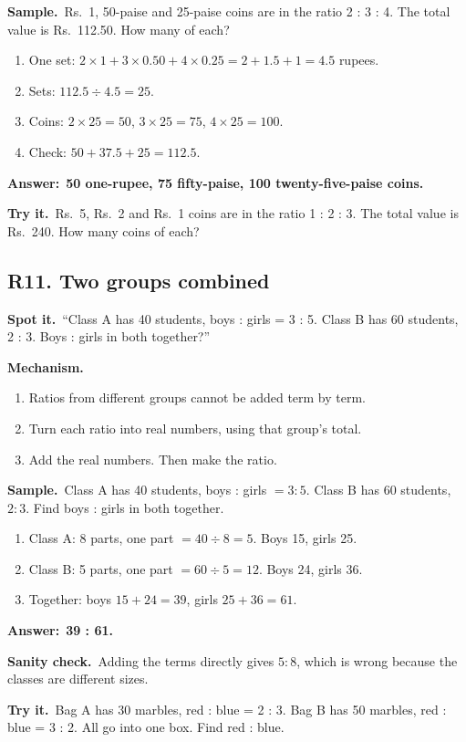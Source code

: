 \documentclass[11pt,a4paper]{article}
\let\oldsubsection\subsection
\renewcommand{\subsection}{\needspace{9\baselineskip}\oldsubsection}
\newcommand{\spot}{\textbf{\color{ember}Spot it.}\ }
\newcommand{\mech}{\textbf{\color{ember}Mechanism.}\ }
\newif\ifkeepsamp
\newcommand{\ans}[1]{\par\nopagebreak\noindent\textbf{\color{ember}Answer:}\ \textbf{#1}\par}
\newcommand{\samp}{\ifkeepsamp\needspace{4\baselineskip}\fi\textbf{\color{ember}Sample.}\ }
\newcommand{\sane}{\textbf{\color{slate}Sanity check.}\ }
\newcommand{\tryit}[1]{\textbf{\color{ember}Try it.}\ #1}
\begin{document}
\samp Rs.\ 1, 50-paise and 25-paise coins are in the ratio 2 : 3 : 4. The total value is Rs.\ 112.50. How many of each?
\begin{enumerate}
\item One set: $2 \times 1 + 3 \times 0.50 + 4 \times 0.25 = 2 + 1.5 + 1 = 4.5$ rupees.
\item Sets: $112.5 \div 4.5 = 25$.
\item Coins: $2 \times 25 = 50$, $3 \times 25 = 75$, $4 \times 25 = 100$.
\item Check: $50 + 37.5 + 25 = 112.5$.
\end{enumerate}
\ans{50 one-rupee, 75 fifty-paise, 100 twenty-five-paise coins.}

\tryit Rs.\ 5, Rs.\ 2 and Rs.\ 1 coins are in the ratio 1 : 2 : 3. The total value is Rs.\ 240. How many coins of each?

\subsection{R11. Two groups combined}
\spot ``Class A has 40 students, boys : girls = 3 : 5. Class B has 60 students, 2 : 3. Boys : girls in both together?''

\mech
\begin{enumerate}
\item Ratios from different groups cannot be added term by term.
\item Turn each ratio into real numbers, using that group's total.
\item Add the real numbers. Then make the ratio.
\end{enumerate}

\samp Class A has 40 students, boys : girls $= 3 : 5$. Class B has 60 students, $2 : 3$. Find boys : girls in both together.
\begin{enumerate}
\item Class A: 8 parts, one part $= 40 \div 8 = 5$. Boys 15, girls 25.
\item Class B: 5 parts, one part $= 60 \div 5 = 12$. Boys 24, girls 36.
\item Together: boys $15 + 24 = 39$, girls $25 + 36 = 61$.
\end{enumerate}
\ans{39 : 61.}

\sane Adding the terms directly gives $5 : 8$, which is wrong because the classes are different sizes.

\tryit Bag A has 30 marbles, red : blue = 2 : 3. Bag B has 50 marbles, red : blue = 3 : 2. All go into one box. Find red : blue.
\end{document}
